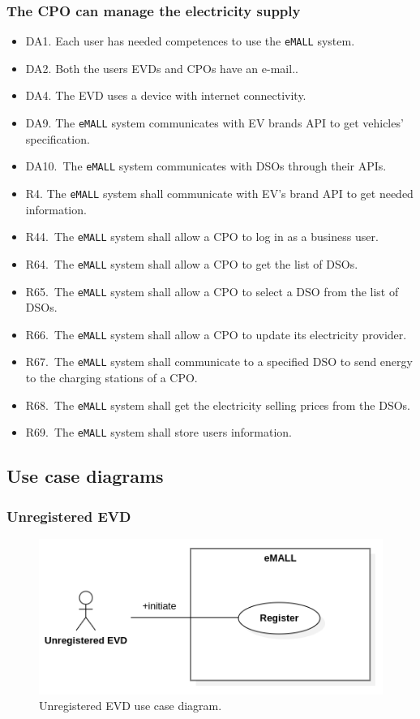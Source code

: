 \subsubsection{The CPO can manage the electricity supply}
\begin{itemize}
    \item DA1. Each user has needed competences to use the \verb|eMALL| system.
    \item DA2. Both the users EVDs and CPOs have an e-mail..
    \item DA4. The EVD uses a device with internet connectivity.
    \item DA9. The \verb|eMALL| system communicates with EV brands API to get vehicles’ specification.
    \item DA10.\ The \verb|eMALL| system communicates with DSOs through their APIs.
    \item R4. The \verb|eMALL| system shall communicate with EV’s brand API to get needed information.
    \item R44.\ The \verb|eMALL| system shall allow a CPO to log in as a business user.
    \item R64.\ The \verb|eMALL| system shall allow a CPO to get the list of DSOs.
    \item R65.\ The \verb|eMALL| system shall allow a CPO to select a DSO from the list of DSOs.
    \item R66.\ The \verb|eMALL| system shall allow a CPO to update its electricity provider.
    \item R67.\ The \verb|eMALL| system shall communicate to a specified DSO to send energy to the
    charging stations of a CPO\@.
    \item R68.\ The \verb|eMALL| system shall get the electricity selling prices from the DSOs.
    \item R69.\ The \verb|eMALL| system shall store users information.
\end{itemize}

\newpage
\subsection{Use case diagrams}
\label{subsec: use_case_diag}%
\subsubsection*{Unregistered EVD}
\begin{figure} [H]
    \begin{center}
        \includegraphics[width=0.7\linewidth]{Images/UseCaseDiagrams/unregistered_EVD_use_case_diagram}
        \caption{Unregistered EVD use case diagram.}
        \label{fig: unregistered_EVD_diag}
    \end{center}
\end{figure}

